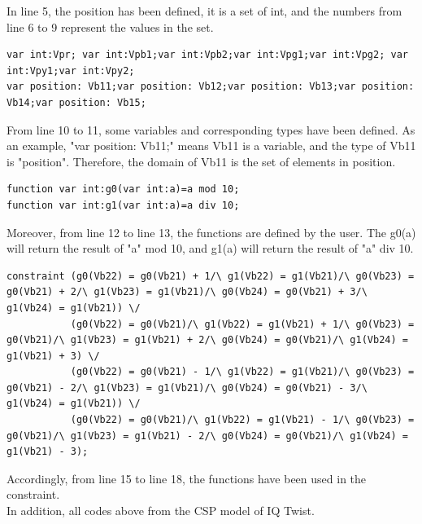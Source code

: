 In line 5, the position has been defined, it is a set of int, and the numbers from line 6 to 9 represent the values in the set.
\begin{lstlisting}[language=minizinc,firstnumber=10]
var int:Vpr; var int:Vpb1;var int:Vpb2;var int:Vpg1;var int:Vpg2; var int:Vpy1;var int:Vpy2;
var position: Vb11;var position: Vb12;var position: Vb13;var position: Vb14;var position: Vb15;
\end{lstlisting}
From line 10 to 11, some variables and corresponding types have been defined. As an example, "var position: Vb11;" means Vb11 is a variable, and the type of Vb11 is "position". Therefore, the domain of Vb11 is the set of elements in position.
\begin{lstlisting}[language=minizinc,firstnumber=12]
function var int:g0(var int:a)=a mod 10;
function var int:g1(var int:a)=a div 10;
\end{lstlisting}
Moreover, from line 12 to line 13, the functions are defined by the user. The g0(a) will return the result of "a" mod 10, and g1(a) will return the result of "a" div 10.
\begin{lstlisting}[language=minizinc,firstnumber=14]
%blue piece2 
constraint (g0(Vb22) = g0(Vb21) + 1/\ g1(Vb22) = g1(Vb21)/\ g0(Vb23) = g0(Vb21) + 2/\ g1(Vb23) = g1(Vb21)/\ g0(Vb24) = g0(Vb21) + 3/\ g1(Vb24) = g1(Vb21)) \/
           (g0(Vb22) = g0(Vb21)/\ g1(Vb22) = g1(Vb21) + 1/\ g0(Vb23) = g0(Vb21)/\ g1(Vb23) = g1(Vb21) + 2/\ g0(Vb24) = g0(Vb21)/\ g1(Vb24) = g1(Vb21) + 3) \/
           (g0(Vb22) = g0(Vb21) - 1/\ g1(Vb22) = g1(Vb21)/\ g0(Vb23) = g0(Vb21) - 2/\ g1(Vb23) = g1(Vb21)/\ g0(Vb24) = g0(Vb21) - 3/\ g1(Vb24) = g1(Vb21)) \/
           (g0(Vb22) = g0(Vb21)/\ g1(Vb22) = g1(Vb21) - 1/\ g0(Vb23) = g0(Vb21)/\ g1(Vb23) = g1(Vb21) - 2/\ g0(Vb24) = g0(Vb21)/\ g1(Vb24) = g1(Vb21) - 3);
\end{lstlisting}
Accordingly, from line 15 to line 18, the functions have been used in the constraint. 
\\In addition, all codes above from the CSP model of IQ Twist.
